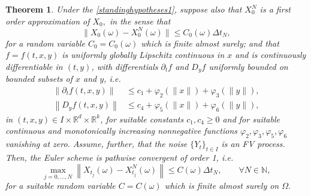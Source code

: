 \documentclass[reqno,12pt]{amsart}
\theoremstyle{plain} %
\newtheorem{theorem}{Theorem}[section]
\theoremstyle{definition} %
\begin{document}
\begin{theorem}
    \label{thmcadlagfv}
    Under the \cref{standinghypotheses1}, suppose also that $X_0^N$ is a first order approximation of $X_0,$ in the sense that
    \begin{equation}
        \label{X0conv}
        \|X_0(\omega) - X_0^N(\omega)\| \leq C_0(\omega)\Delta t_N,
    \end{equation}
    for a random variable $C_0=C_0(\omega)$ which is finite almost surely; and that $f=f(t, x, y)$ is uniformly globally Lipschitz continuous in $x$ and is continuously differentiable in $(t, y)$, with differentials $\partial_t f$ and $D_y f$ uniformly bounded on bounded subsets of $x$ and $y$, i.e.
    \begin{align}
        \label{ftfyboundedgrowthcadlagfpartialt}
        \left\|\partial_t f(t, x, y)\right\| & \leq c_1 + \varphi_2(\|x\|) + \varphi_3(\|y\|), \\
        \label{ftfyboundedgrowthcadlagfpartialy}
        \left\|D_y f(t, x, y)\right\| & \leq c_4 + \varphi_5(\|x\|) + \varphi_6(\|y\|),
    \end{align}
    in $(t, x, y)\in I\times \mathbb{R}^d\times \mathbb{R}^k$, for suitable constants $c_1, c_4 \geq 0$ and for suitable continuous and monotonically increasing nonnegative functions $\varphi_2, \varphi_3, \varphi_5, \varphi_6$ vanishing at zero. Assume, further, that the noise $\{Y_t\}_{t\in I}$ is an FV process. Then, the Euler scheme is pathwise convergent of order 1, i.e.
    \begin{equation}
        \label{ordercadlagfv}
        \max_{j=0, \ldots, N} \left\| X_{t_j}(\omega) - X_{t_j}^N(\omega) \right\| \leq C(\omega) \Delta t_N, \qquad \forall N \in \mathbb{N},
    \end{equation}
    for a suitable random variable $C=C(\omega)$ which is finite almost surely on $\Omega.$
\end{theorem}
\end{document}
